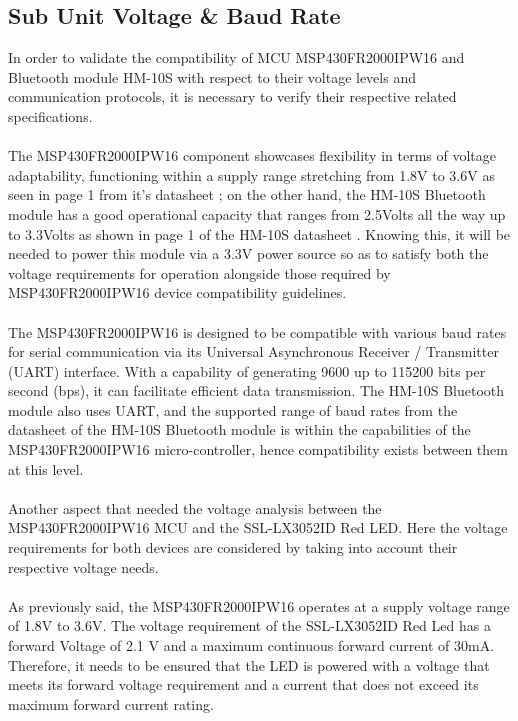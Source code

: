 \subsection{Sub Unit Voltage \& Baud Rate}
In order to validate the compatibility of MCU MSP430FR2000IPW16 and Bluetooth module HM-10S with respect to their voltage levels and communication protocols, it is necessary to verify their respective related specifications.\\\\
The MSP430FR2000IPW16 component showcases flexibility in terms of voltage adaptability, functioning within a supply range stretching from 1.8V to 3.6V as seen in page 1 from it’s datasheet \cite{MSP430FR2000IPW16}; on the other hand, the HM-10S Bluetooth module has a good operational capacity that ranges from 2.5Volts all the way up to 3.3Volts as shown in page 1 of the HM-10S datasheet \cite{HM10BluetoothModule}. Knowing this, it will be needed to power this module via a 3.3V power source so as to satisfy both the voltage requirements for operation alongside those required by MSP430FR2000IPW16 device compatibility guidelines.\\\\
The MSP430FR2000IPW16 is designed to be compatible with various baud rates for serial communication via its Universal Asynchronous Receiver / Transmitter (UART) interface. With a capability of generating 9600 up to 115200 bits per second (bps), it can facilitate efficient data transmission. The HM-10S Bluetooth module also uses UART, and the supported range of baud rates from the datasheet of the HM-10S Bluetooth module is within the capabilities of the MSP430FR2000IPW16 micro-controller, hence compatibility exists between them at this level.\\\\
Another aspect that needed the voltage analysis between the MSP430FR2000IPW16 MCU and the SSL-LX3052ID Red LED. Here the voltage requirements for both devices are considered by taking into account their respective voltage needs.\\\\
As previously said, the MSP430FR2000IPW16 operates at a supply voltage range of 1.8V to 3.6V. The voltage requirement of the SSL-LX3052ID Red Led has a forward Voltage of 2.1 V and a maximum continuous forward current of 30mA. Therefore, it needs to be ensured that the LED is powered with a voltage that meets its forward voltage requirement and a current that does not exceed its maximum forward current rating. \\\\
